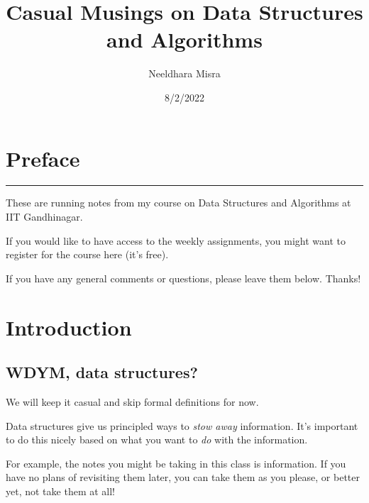 \documentclass[
  letterpaper,
  DIV=11,
  numbers=noendperiod]{scrreprt}
\title{Casual Musings on Data Structures and Algorithms}
\author{Neeldhara Misra}
\date{8/2/2022}
\renewcommand*\contentsname{Table of contents}
\newcommand\contentsname{Table of contents}
\begin{document}
\maketitle
\ifdefined\Shaded\renewenvironment{Shaded}{\begin{tcolorbox}[sharp corners, interior hidden, boxrule=0pt, enhanced, borderline west={3pt}{0pt}{shadecolor}, breakable, frame hidden]}{\end{tcolorbox}}\fi

\renewcommand*\contentsname{Table of contents}
{
\hypersetup{linkcolor=}
\setcounter{tocdepth}{2}
\tableofcontents
}
\hypertarget{preface}{%
\chapter*{Preface}\label{preface}}

\begin{center}\rule{0.5\linewidth}{0.5pt}\end{center}

These are running notes from my course on Data Structures and Algorithms
at IIT Gandhinagar.

If you would like to have access to the weekly assignments, you might
want to register for the course here (it's free).

If you have any general comments or questions, please leave them below.
Thanks!

\hypertarget{hyvor-talk-view}{}

\hypertarget{introduction}{%
\chapter{Introduction}\label{introduction}}

\hypertarget{wdym-data-structures}{%
\section{WDYM, data structures?}\label{wdym-data-structures}}

We will keep it casual and skip formal definitions for now. 👀

Data structures give us principled ways to \emph{stow away} information.
It's important to do this nicely based on what you want to \emph{do}
with the information.

For example, the notes you might be taking in this class is information.
If you have no plans of revisiting them later, you can take them as you
please, or better yet, not take them at all!
\end{document}
